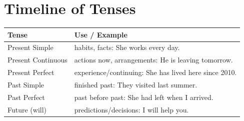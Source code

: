 \documentclass[12pt,oneside]{book}
\begin{document}
\section*{Timeline of Tenses}
\begin{longtable}{p{4cm}p{10cm}}
\toprule
Tense & Use / Example \\
\midrule
Present Simple & habits, facts: She works every day. \\
Present Continuous & actions now, arrangements: He is leaving tomorrow. \\
Present Perfect & experience/continuing: She has lived here since 2010. \\
Past Simple & finished past: They visited last summer. \\
Past Perfect & past before past: She had left when I arrived. \\
Future (will) & predictions/decisions: I will help you. \\
\bottomrule
\end{longtable}

\printindex
\end{document}
